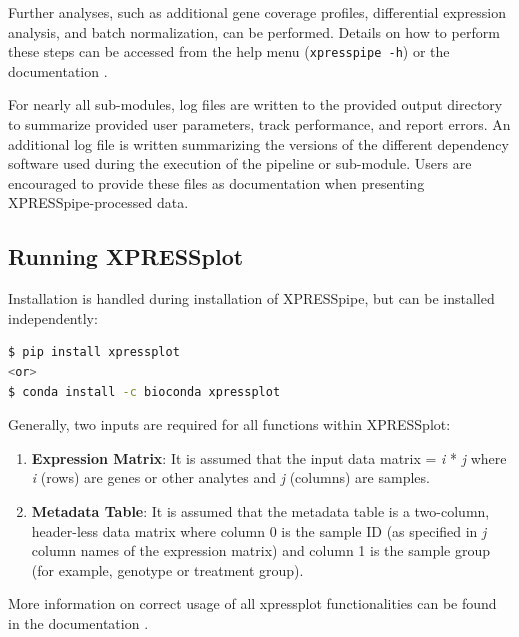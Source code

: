 \documentclass[10pt, oneside]{article}
\begin{document}
Further analyses, such as additional gene coverage profiles, differential expression analysis, and batch normalization, can be performed. Details on how to perform these steps can be accessed from the help menu (\texttt{xpresspipe -h}) or the documentation \cite{xpresspipe_docs}. \par

For nearly all sub-modules, log files are written to the provided output directory to summarize provided user parameters, track performance, and report errors. An additional log file is written summarizing the versions of the different dependency software used during the execution of the pipeline or sub-module. Users are encouraged to provide these files as documentation when presenting XPRESSpipe-processed data. \\

\subsection*{Running XPRESSplot}
Installation is handled during installation of XPRESSpipe, but can be installed independently:

\begin{lstlisting}[language=bash, caption=XPRESSplot install]
$ pip install xpressplot
<or>
$ conda install -c bioconda xpressplot
\end{lstlisting}

Generally, two inputs are required for all functions within XPRESSplot:

\begin{enumerate}
  \item \textbf{Expression Matrix}: It is assumed that the input data matrix = \textit{i} * \textit{j} where \textit{i} (rows) are genes or other analytes and \textit{j} (columns) are samples.
  \item \textbf{Metadata Table}: It is assumed that the metadata table is a two-column, header-less data matrix where column 0 is the sample ID (as specified in \textit{j} column names of the expression matrix) and column 1 is the sample group (for example, genotype or treatment group).
\end{enumerate}

More information on correct usage of all xpressplot functionalities can be found in the documentation \cite{xpressplot_docs}.\\
\end{document}
